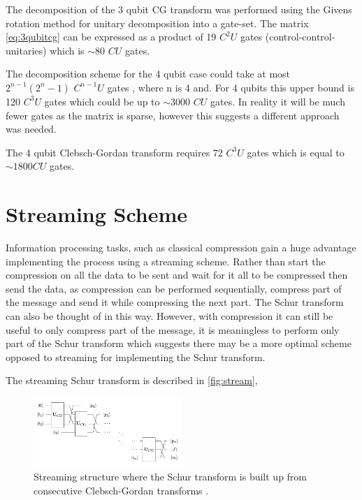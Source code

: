 \documentclass[12pt]{article}
\begin{document}
The decomposition of the 3 qubit CG transform was performed using the Givens rotation method for unitary decomposition into a gate-set. The matrix \autoref{eq:3qubitcg} can be expressed as a product of 19 $C^2U$ gates (control-control-unitaries) which is $\sim$80 $CU$ gates. 

The decomposition scheme for the 4 qubit case could take at most $2^{n-1}(2^n-1)$ $C^{n-1}U$ gates \cite{li2013decomposition}, where n is 4 and. For 4 qubits this upper bound is 120 $C^3U$ gates which could be up to $\sim 3000$ $CU$ gates. In reality it will be much fewer gates as the matrix is sparse, however this suggests a different approach was needed.

The 4 qubit Clebsch-Gordan transform requires 72 $C^3U$ gates which is equal to $\sim 1800 CU$ gates. 

\section{Streaming Scheme}

Information processing tasks, such as classical compression gain a huge advantage implementing the process using a streaming scheme. Rather than start the compression on all the data to be sent and wait for it all to
be compressed then send the data, as compression can be performed sequentially, compress part of the message and send it while compressing the next part. The Schur transform can also be thought of in this way. However,
with compression it can still be useful to only compress part of the message, it is meaningless to perform only part of the Schur transform which suggests there may be a more optimal scheme opposed to streaming for 
implementing the Schur transform.      


The streaming Schur transform is described in \autoref{fig:stream},

\begin{figure}[h!]
\centering
\includegraphics[width=0.5\textwidth]{schurcascade.png}
\caption{Streaming structure where the Schur transform is built up from consecutive Clebsch-Gordan transforms \cite{bacon2006efficient}.}
\label{fig:stream}
\end{figure}
\end{document}
